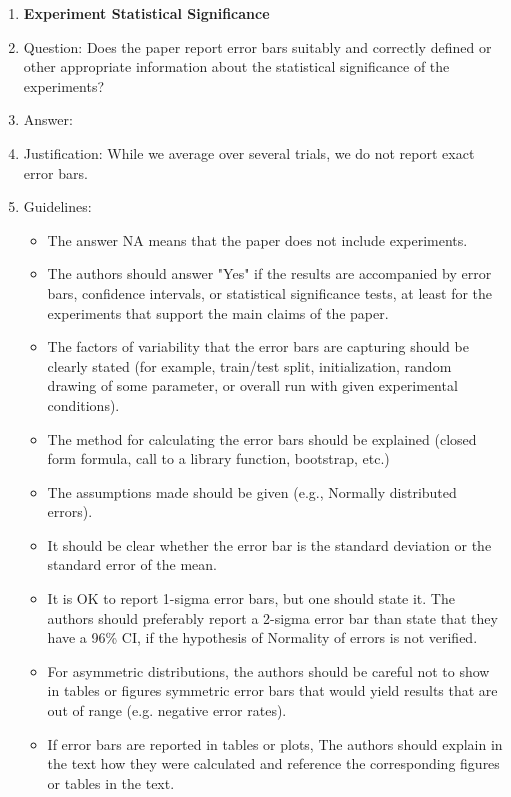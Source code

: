 \documentclass{article}
\begin{document}
\begin{enumerate}
\item {\bf Experiment Statistical Significance}
    \item[] Question: Does the paper report error bars suitably and correctly defined or other appropriate information about the statistical significance of the experiments?
    \item[] Answer: \answerNo{} %
    \item[] Justification: While we average over several trials, we do not report exact error bars. 
    \item[] Guidelines:
    \begin{itemize}
        \item The answer NA means that the paper does not include experiments.
        \item The authors should answer "Yes" if the results are accompanied by error bars, confidence intervals, or statistical significance tests, at least for the experiments that support the main claims of the paper.
        \item The factors of variability that the error bars are capturing should be clearly stated (for example, train/test split, initialization, random drawing of some parameter, or overall run with given experimental conditions).
        \item The method for calculating the error bars should be explained (closed form formula, call to a library function, bootstrap, etc.)
        \item The assumptions made should be given (e.g., Normally distributed errors).
        \item It should be clear whether the error bar is the standard deviation or the standard error of the mean.
        \item It is OK to report 1-sigma error bars, but one should state it. The authors should preferably report a 2-sigma error bar than state that they have a 96\% CI, if the hypothesis of Normality of errors is not verified.
        \item For asymmetric distributions, the authors should be careful not to show in tables or figures symmetric error bars that would yield results that are out of range (e.g. negative error rates).
        \item If error bars are reported in tables or plots, The authors should explain in the text how they were calculated and reference the corresponding figures or tables in the text.
    \end{itemize}


\end{enumerate}
\end{document}

